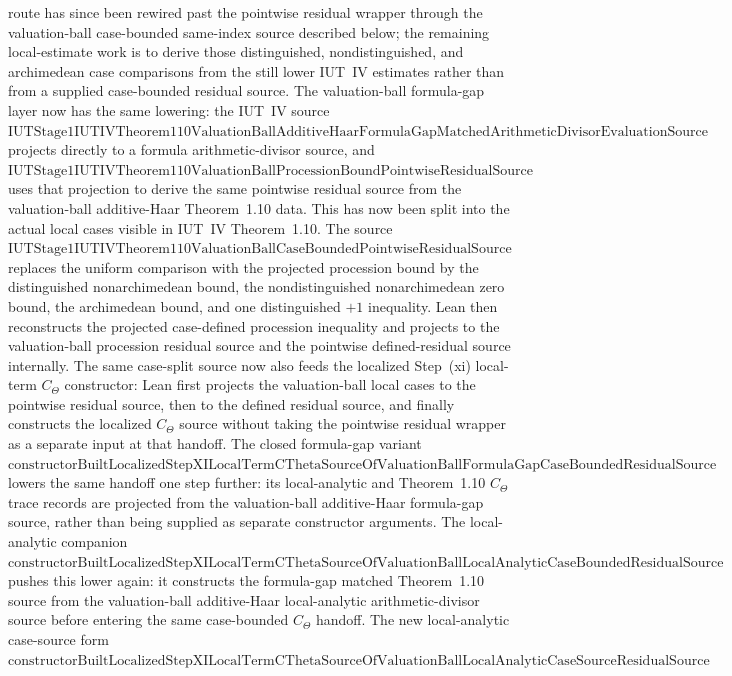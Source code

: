 \documentclass[11pt]{article}
\theoremstyle{plain}
\theoremstyle{definition}
\theoremstyle{remark}
\begin{document}
route has since been rewired past the pointwise residual wrapper through the
valuation-ball case-bounded same-index source described below; the remaining
local-estimate work is to derive those distinguished, nondistinguished, and
archimedean case comparisons from the still lower IUT~IV estimates rather than
from a supplied case-bounded residual source.  The valuation-ball formula-gap
layer now has the same lowering: the IUT~IV source
\(\mathrm{IUTStage1IUTIVTheorem110ValuationBallAdditiveHaarFormulaGapMatchedArithmeticDivisorEvaluationSource}\)
projects directly to a formula arithmetic-divisor source, and
\(\mathrm{IUTStage1IUTIVTheorem110ValuationBallProcessionBoundPointwiseResidualSource}\)
uses that projection to derive the same pointwise residual source from the
valuation-ball additive-Haar Theorem~1.10 data.
This has now been split into the actual local cases visible in IUT~IV
Theorem~1.10.  The source
\(\mathrm{IUTStage1IUTIVTheorem110ValuationBallCaseBoundedPointwiseResidualSource}\)
replaces the uniform comparison with the projected procession bound by the
distinguished nonarchimedean bound, the nondistinguished nonarchimedean zero
bound, the archimedean bound, and one distinguished \(+1\) inequality.  Lean
then reconstructs the projected case-defined procession inequality and
projects to the valuation-ball procession residual source and the pointwise
defined-residual source internally.  The same case-split source now also feeds
the localized Step~(xi) local-term \(C_\Theta\) constructor: Lean first
projects the valuation-ball local cases to the pointwise residual source, then
to the defined residual source, and finally constructs the localized
\(C_\Theta\) source without taking the pointwise residual wrapper as a
separate input at that handoff.  The closed formula-gap variant
\(\mathrm{constructorBuiltLocalizedStepXILocalTermCThetaSourceOfValuationBallFormulaGapCaseBoundedResidualSource}\)
lowers the same handoff one step further: its local-analytic and
Theorem~1.10 \(C_\Theta\) trace records are projected from the valuation-ball
additive-Haar formula-gap source, rather than being supplied as separate
constructor arguments.  The local-analytic companion
  \(\mathrm{constructorBuiltLocalizedStepXILocalTermCThetaSourceOfValuationBallLocalAnalyticCaseBoundedResidualSource}\)
pushes this lower again: it constructs the formula-gap matched Theorem~1.10
source from the valuation-ball additive-Haar local-analytic arithmetic-divisor
source before entering the same case-bounded \(C_\Theta\) handoff.  The new
local-analytic case-source form
\(\mathrm{constructorBuiltLocalizedStepXILocalTermCThetaSourceOfValuationBallLocalAnalyticCaseSourceResidualSource}\)
\end{document}
